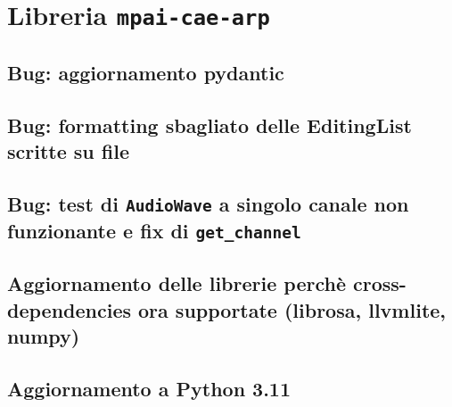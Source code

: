 \section{Libreria \texttt{mpai-cae-arp}}    %
\subsection{Bug: aggiornamento pydantic}    %
\subsection{Bug: formatting sbagliato delle EditingList scritte su file}
\subsection{Bug: test di \texttt{AudioWave} a singolo canale non funzionante e fix di \texttt{get\_channel}}
\subsection{Aggiornamento delle librerie perchè cross-dependencies ora supportate (librosa, llvmlite, numpy)}
\subsection{Aggiornamento a Python 3.11} \label{ssec:py-311}
